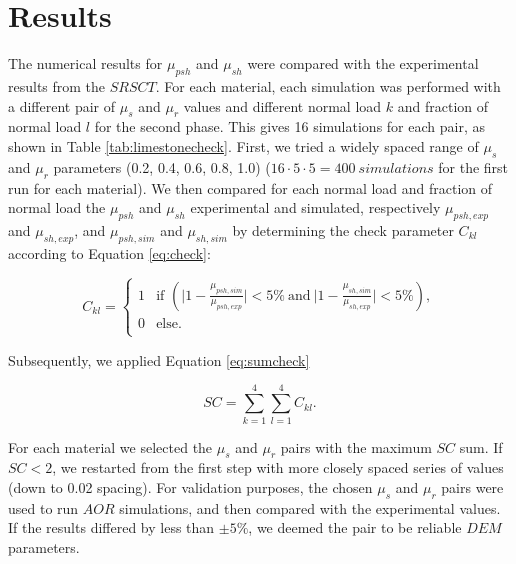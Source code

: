 \documentclass{CFD2015}
\begin{document}

\section{Results}

The numerical results for $\mu_{psh}$ and $\mu_{sh}$ were compared with the experimental results from the $SRSCT$.
For each material, each simulation was performed with a different pair of $\mu_s$ and $\mu_r$ values and different normal load $k$ and fraction of normal load $l$ for the second phase. 
This gives 16 simulations for each pair, as shown in Table \ref{tab:limestonecheck}.
First, we tried a widely spaced range of $\mu_s$ and $\mu_r$ parameters (0.2, 0.4, 0.6, 0.8, 1.0) ($16 \cdot 5 \cdot 5 = 400 ~simulations$ for the first run for each material).
We then compared for each normal load and fraction of normal load the $\mu_{psh}$ and $\mu_{sh}$ 
experimental and simulated,
respectively $\mu_{psh,exp}$ and $\mu_{sh,exp}$, and $\mu_{psh,sim}$ and $\mu_{sh,sim}$ by determining the check parameter $C_{kl}$ according to Equation \ref{eq:check}:

 \small
 \begin{equation}
  C_{kl} = 
 \begin{cases}
1 & \text{if } (\lvert{1-\frac{\mu_{psh,sim}}{\mu_{psh,exp}}}\rvert < 5\% ~\text{and}~ \lvert{1-\frac{\mu_{sh,sim}}{\mu_{sh,exp}}}\rvert < 5\% ) ,\\
0 & \text{else} .\\ 
\end{cases}
 \label{eq:check}
\end{equation}
\normalsize


Subsequently, we applied Equation \ref{eq:sumcheck}

\begin{equation}
SC = \sum_{k=1}^{4}{\sum_{l=1}^{4}{C_{kl}}} .
 \label{eq:sumcheck}
\end{equation}

For each material we selected the $\mu_s$ and $\mu_r$ pairs with the maximum $SC$ sum.
If $SC < 2$, we restarted from the first step with more closely spaced series of values (down to 0.02 spacing).
For validation purposes, the chosen $\mu_s$ and $\mu_r$ pairs were used to run $AOR$ simulations, and then compared with the experimental values. 
If the results differed by less than $\pm 5\%$, we deemed the pair to be reliable $DEM$ parameters.\\
\end{document}
